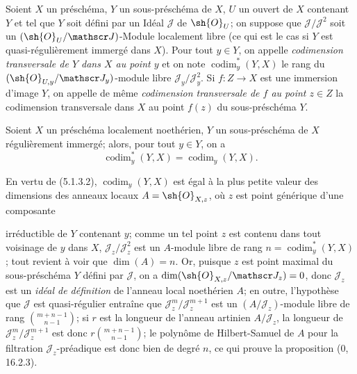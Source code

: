 \begin{definition}[19.1.3]
Soient $X$ un préschéma, $Y$ un sous-préschéma de $X$, $U$ un ouvert de $X$ contenant $Y$ et tel que $Y$ soit défini par un Idéal $\mathscr J$ de $\sh{O}_U$; on suppose que $\mathscr J/\mathscr J^2$ soit un $(\sh{O}_U/\mathscr J)$-Module localement libre (ce qui est le cas si $Y$ est quasi-régulièrement immergé dans $X$). Pour tout $y\in Y$, on appelle \emph{codimension transversale de $Y$ dans $X$ au point $y$} et on note $\operatorname{codim}_y^*(Y,X)$ le rang du $(\sh{O}_{U,y}/\mathscr J_y)$-module libre $\mathscr J_y/\mathscr J_y^2$. Si $f:Z\to X$ est une immersion d'image $Y$, on appelle de même \emph{codimension transversale de $f$ au point $z\in Z$} la codimension transversale dans $X$ au point $f(z)$ du sous-préschéma $Y$.
\end{definition}

\begin{proposition}[19.1.4]
\label{IV.19.1.4}
Soient $X$ un préschéma localement noethérien, $Y$ un sous-préschéma de $X$ régulièrement immergé; alors, pour tout $y\in Y$, on a
\begin{equation}
  \operatorname{codim}_y^*(Y,X)=\operatorname{codim}_y(Y,X).
  \tag{19.1.4.1}\label{IV.19.1.4.1}
\end{equation}
\end{proposition}

En vertu de (5.1.3.2), $\operatorname{codim}_y(Y,X)$ est égal à la plus petite valeur des dimensions des anneaux locaux $A=\sh{O}_{X,z}$, où $z$ est point générique d'une composante


irréductible de $Y$ contenant $y$; comme un tel point $z$ est contenu dans tout voisinage de $y$ dans $X$, $\mathscr J_z/\mathscr J_z^2$ est un $A$-module libre de rang $n=\operatorname{codim}_y^*(Y,X)$; tout revient à voir que $\dim(A)=n$. Or, puisque $z$ est point maximal du sous-préschéma $Y$ défini par $\mathscr J$, on a $\dim(\sh{O}_{X,z}/\mathscr J_z)=0$, donc $\mathscr J_z$ est un \emph{idéal de définition} de l'anneau local noethérien $A$; en outre, l'hypothèse que $\mathscr J$ est quasi-régulier entraîne que $\mathscr J_z^m/\mathscr J_z^{m+1}$ est un $(A/\mathscr J_z)$-module libre de rang $\binom{m+n-1}{n-1}$; si $r$ est la longueur de l'anneau artinien $A/\mathscr J_z$, la longueur de $\mathscr J_z^m/\mathscr J_z^{m+1}$ est donc $r\binom{m+n-1}{n-1}$; le polynôme de Hilbert-Samuel de $A$ pour la filtration $\mathscr J_z$-préadique est donc bien de degré $n$, ce qui prouve la proposition ($0$, 16.2.3).

